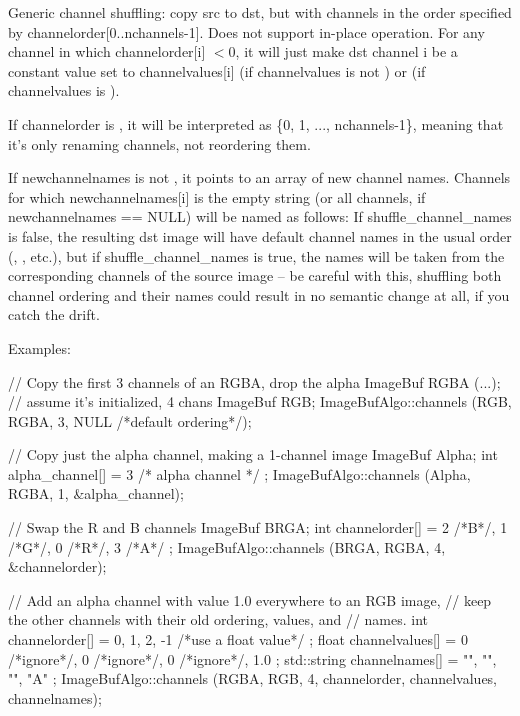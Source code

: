  

Generic channel shuffling: copy {\cf src} to {\cf dst}, but with channels in
the order specified by {\cf channelorder[0..nchannels-1]}.  Does not support in-place
operation.  For any channel in which {\cf channelorder[i]} $< 0$, it will
just make {\cf dst} channel {\cf i} be a constant value set to {\cf channelvalues[i]}
(if {\cf channelvalues} is not \NULL) or {} (if {\cf channelvalues} is \NULL).

If {\cf channelorder} is \NULL, it will be interpreted as
{\cf \{0, 1, ..., nchannels-1\}}, meaning that it's only renaming channels,
not reordering them.

If {\cf newchannelnames} is not \NULL, it points to an array of new channel
names.  Channels for which {\cf newchannelnames[i]} is the empty string (or
all channels, if {\cf newchannelnames == NULL}) will be named as follows:
If {\cf shuffle_channel_names} is {\cf false}, the resulting dst image will have
default channel names in the usual order (, , etc.), but if
{\cf shuffle_channel_names} is {\cf true}, the names will be taken from the
corresponding channels of the source image -- be careful with this,
shuffling both channel ordering and their names could result in no
semantic change at all, if you catch the drift.

\smallskip
\noindent Examples:
\begin{code}
    // Copy the first 3 channels of an RGBA, drop the alpha
    ImageBuf RGBA (...);   // assume it's initialized, 4 chans
    ImageBuf RGB;
    ImageBufAlgo::channels (RGB, RGBA, 3, NULL /*default ordering*/);

    // Copy just the alpha channel, making a 1-channel image
    ImageBuf Alpha;
    int alpha_channel[] = { 3 /* alpha channel */ };
    ImageBufAlgo::channels (Alpha, RGBA, 1, &alpha_channel);

    // Swap the R and B channels
    ImageBuf BRGA;
    int channelorder[] = { 2 /*B*/, 1 /*G*/, 0 /*R*/, 3 /*A*/ };
    ImageBufAlgo::channels (BRGA, RGBA, 4, &channelorder);

    // Add an alpha channel with value 1.0 everywhere to an RGB image,
    // keep the other channels with their old ordering, values, and
    // names.
    int channelorder[] = { 0, 1, 2, -1 /*use a float value*/ };
    float channelvalues[] = { 0 /*ignore*/, 0 /*ignore*/, 0 /*ignore*/, 1.0 };
    std::string channelnames[] = { "", "", "", "A" };
    ImageBufAlgo::channels (RGBA, RGB, 4, channelorder,
                            channelvalues, channelnames);
\end{code}
\apiend

